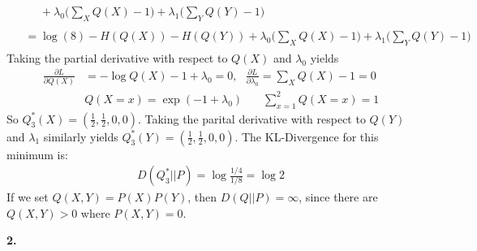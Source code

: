 \documentclass{article}
\begin{document}
\begin{enumerate}[(a)]
\begin{align*}
\begin{split}
                & \ \ \ \  \ \ + \lambda_0 \bigg( \sum_{X} Q(X) - 1 \bigg) + \lambda_1 \bigg( \sum_{Y} Q(Y) - 1 \bigg)
        \end{split}\\[0.5ex]
        \begin{split}
            {}&= \log(8) - H(Q(X)) - H(Q(Y)) +  \lambda_0 \bigg( \sum_{X} Q(X) - 1 \bigg) + \lambda_1 \bigg( \sum_{Y} Q(Y) - 1 \bigg) 
        \end{split}
    \end{align*}
    Taking the partial derivative with respect to $Q(X)$ and $\lambda_0$ yields \begin{align*}
        \frac{\partial L}{\partial Q(X)} &= - \log Q(X) - 1 + \lambda_0 = 0 , \ \ \ \frac{\partial L}{\partial \lambda_0} =  \sum_{X}Q(X) - 1 = 0\\[1.0ex]
        &Q(X = x) = \exp(-1 + \lambda_0) \ \ \ \ \ \ \ \ \sum_{x = 1}^{2}Q(X = x) = 1 
    \end{align*}
    So $Q^*_3(X) = (\frac{1}{2}, \frac{1}{2}, 0, 0)$. Taking the parital derivative with respect to $Q(Y)$ and $\lambda_1$ similarly yields $Q^*_3(Y) = (\frac{1}{2}, \frac{1}{2}, 0, 0)$. The KL-Divergence for this minimum is: \begin{align*}
        D(Q^*_3 || P) =  \log \frac{1/4}{1/8} = \log 2
    \end{align*}
    If we set $Q(X, Y) = P(X)P(Y)$, then $D(Q||P) = \infty$, since there are $Q(X, Y) > 0$ where $P(X, Y) = 0$. 
\end{enumerate}
\textbf{2.} 
\end{document}
